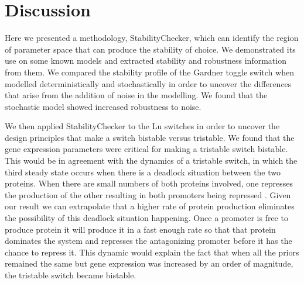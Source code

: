 \newpage
\section{Discussion}

Here we presented a methodology, StabilityChecker, which can identify the region of parameter space that can produce the stability of choice. We demonstrated its use on some known models and extracted stability and robustness information from them. We compared the stability profile of the Gardner toggle switch when modelled deterministically and stochastically in order to uncover the differences that arise from the addition of noise in the modelling. We found that the stochastic model showed increased robustness to noise.

We then applied StabilityChecker to the Lu switches in order to uncover the design principles that make a switch bistable versus tristable. We found that the gene expression parameters were critical for making a tristable switch bistable. This would be in agreement with the dynamics of a tristable switch, in which the third steady state occurs when there is a deadlock situation between the two proteins. When there are small numbers of both proteins involved, one represses the production of the other resulting in both promoters being repressed \autocite{Ma:2012dt}. Given our result we can extrapolate that a higher rate of protein production eliminates the possibility of this deadlock situation happening. Once a promoter is free to produce protein it will produce it in a fast enough rate so that that protein dominates the system and represses the antagonizing promoter before it has the chance to repress it. This dynamic would explain the fact that when all the priors remained the same but gene expression was increased by an order of magnitude, the tristable switch became bistable. 


